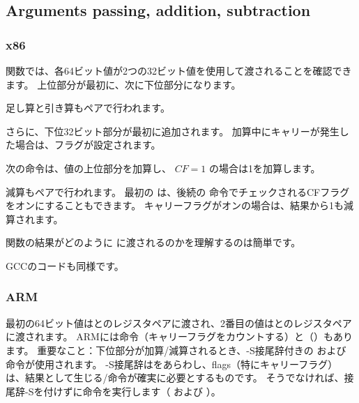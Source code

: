 ﻿\subsection{Arguments passing, addition, subtraction}



\subsubsection{x86}



関数では、各64ビット値が2つの32ビット値を使用して渡されることを確認できます。
上位部分が最初に、次に下位部分になります。

足し算と引き算もペアで行われます。

さらに、下位32ビット部分が最初に追加されます。 
加算中にキャリーが発生した場合は、フラグが設定されます。

次の命令は、値の上位部分を加算し、 $CF=1$ の場合は1を加算します。

減算もペアで行われます。 
最初の \SUB は、後続の  命令でチェックされるCFフラグをオンにすることもできます。
キャリーフラグがオンの場合は、結果から1も減算されます。

関数の結果がどのように \printf{} に渡されるのかを理解するのは簡単です。



GCCのコードも同様です。

\subsubsection{ARM}




最初の64ビット値はとのレジスタペアに渡され、2番目の値はとのレジスタペアに渡されます。 
ARMには命令（キャリーフラグをカウントする）と（）もあります。
重要なこと：下位部分が加算/減算されるとき、-S接尾辞付きの および 命令が使用されます。 
-S接尾辞はをあらわし、flags（特にキャリーフラグ）は、結果として生じる/命令が確実に必要とするものです。
そうでなければ、接尾辞-Sを付けずに命令を実行します（ \ADD および \SUB ）。

